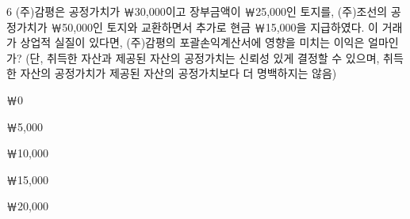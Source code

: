 \begin{question}{6}
(주)감평은 공정가치가 ￦30,000이고 장부금액이 ￦25,000인 토지를, (주)조선의 공정가치가 ￦50,000인 토지와 교환하면서 추가로 현금 ￦15,000을 지급하였다. 이 거래가 상업적 실질이 있다면, (주)감평의 포괄손익계산서에 영향을 미치는 이익은 얼마인가? (단, 취득한 자산과 제공된 자산의 공정가치는 신뢰성 있게 결정할 수 있으며, 취득한 자산의 공정가치가 제공된 자산의 공정가치보다 더 명백하지는 않음)
\begin{choices}
  \item ￦0
  \item ￦5,000
  \item ￦10,000
  \item ￦15,000
  \item ￦20,000
\end{choices}
\end{question}

